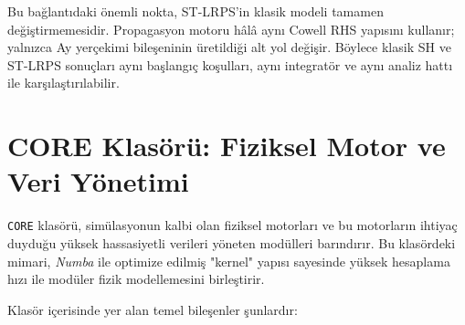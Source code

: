 Bu bağlantıdaki önemli nokta, ST-LRPS'in klasik modeli tamamen değiştirmemesidir. Propagasyon motoru hâlâ aynı Cowell RHS yapısını kullanır; yalnızca Ay yerçekimi bileşeninin üretildiği alt yol değişir. Böylece klasik SH ve ST-LRPS sonuçları aynı başlangıç koşulları, aynı integratör ve aynı analiz hattı ile karşılaştırılabilir.


\newpage
\section{CORE Klasörü: Fiziksel Motor ve Veri Yönetimi}
\label{sec:core_folder}

\texttt{CORE} klasörü, simülasyonun kalbi olan fiziksel motorları ve bu motorların ihtiyaç duyduğu yüksek hassasiyetli verileri yöneten modülleri barındırır. Bu klasördeki mimari, \textit{Numba} ile optimize edilmiş "kernel" yapısı sayesinde yüksek hesaplama hızı ile modüler fizik modellemesini birleştirir.

Klasör içerisinde yer alan temel bileşenler şunlardır:


